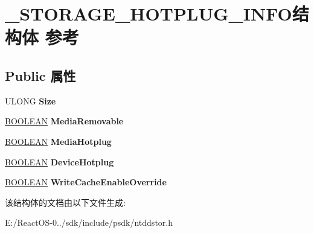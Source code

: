 \hypertarget{struct___s_t_o_r_a_g_e___h_o_t_p_l_u_g___i_n_f_o}{}\section{\+\_\+\+S\+T\+O\+R\+A\+G\+E\+\_\+\+H\+O\+T\+P\+L\+U\+G\+\_\+\+I\+N\+F\+O结构体 参考}
\label{struct___s_t_o_r_a_g_e___h_o_t_p_l_u_g___i_n_f_o}
\subsection*{Public 属性}
\begin{DoxyCompactItemize}
\item 
\mbox{\label{struct___s_t_o_r_a_g_e___h_o_t_p_l_u_g___i_n_f_o_a7fe32a0277937a64e49f2423768a09b5}} 
U\+L\+O\+NG {\bfseries Size}
\item 
\mbox{\label{struct___s_t_o_r_a_g_e___h_o_t_p_l_u_g___i_n_f_o_a2ef86cb63ed272afa48071d84ea3c5f6}} 
\hyperlink{_processor_bind_8h_a112e3146cb38b6ee95e64d85842e380a}{B\+O\+O\+L\+E\+AN} {\bfseries Media\+Removable}
\item 
\mbox{\label{struct___s_t_o_r_a_g_e___h_o_t_p_l_u_g___i_n_f_o_af5ea9dc280342da72444c65e0cd46f67}} 
\hyperlink{_processor_bind_8h_a112e3146cb38b6ee95e64d85842e380a}{B\+O\+O\+L\+E\+AN} {\bfseries Media\+Hotplug}
\item 
\mbox{\label{struct___s_t_o_r_a_g_e___h_o_t_p_l_u_g___i_n_f_o_a342563dc06605f93d524bc88a9519572}} 
\hyperlink{_processor_bind_8h_a112e3146cb38b6ee95e64d85842e380a}{B\+O\+O\+L\+E\+AN} {\bfseries Device\+Hotplug}
\item 
\mbox{\label{struct___s_t_o_r_a_g_e___h_o_t_p_l_u_g___i_n_f_o_a1d8a5dd24eabcf6c43e191d96961c1af}} 
\hyperlink{_processor_bind_8h_a112e3146cb38b6ee95e64d85842e380a}{B\+O\+O\+L\+E\+AN} {\bfseries Write\+Cache\+Enable\+Override}
\end{DoxyCompactItemize}


该结构体的文档由以下文件生成\+:\begin{DoxyCompactItemize}
\item 
E\+:/\+React\+O\+S-\/0../sdk/include/psdk/ntddstor.\+h\end{DoxyCompactItemize}
